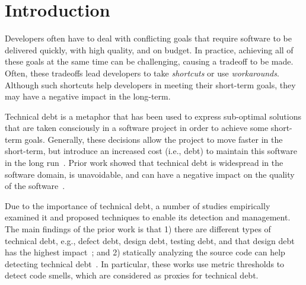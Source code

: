 \documentclass{sig-alternate}
\begin{document}

\terms{}

\keywords{}

\section{Introduction}
\label{sec:introduction}
Developers often have to deal with conflicting goals that require software to be delivered quickly, with high quality, and on budget. In practice, achieving all of these goals at the same time can be challenging, causing a tradeoff to be made. Often, these tradeoffs lead developers to take \emph{shortcuts} or use \emph{workarounds}. Although such shortcuts help developers in meeting their short-term goals, they may have a negative impact in the long-term.

Technical debt is a metaphor that has been used to express sub-optimal solutions that are taken consciously in a software project in order to achieve some short-term goals. Generally, these decisions allow the project to move faster in the short-term, but introduce an increased cost (i.e., debt) to maintain this software in the long run~\cite{Seaman2011,Kruchten2013IWMTD}. Prior work showed that technical debt is widespread in the software domain, is unavoidable, and can have a negative impact on the quality of the software~\cite{Lim2012Software}.

Due to the importance of technical debt, a number of studies empirically examined it and proposed techniques to enable its detection and management. The main findings of the prior work is that 1) there are different types of technical debt, e.g., defect debt, design debt, testing debt, and that design debt has the highest impact~\cite{Alves2014MTD,Marinescu2012IBM}; and 2) statically analyzing the source code can help detecting technical debt~\cite{Marinescu2004ICSM,Marinescu2010CSMR,Zazworka2013CSE}. In particular, these works use metric thresholds to detect code smells, which are considered as proxies for technical debt. 
\end{document}
